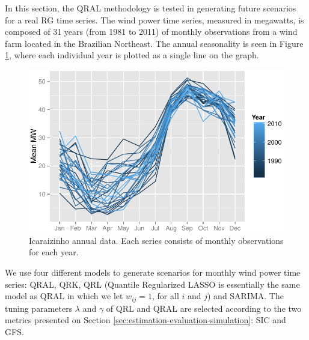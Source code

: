 In this section, the QRAL methodology is tested in generating future scenarios for a real RG time series. The wind power time series, measured in megawatts, is composed of 31 years (from 1981 to 2011) of monthly observations from a wind farm located in the Brazilian Northeast. %
The annual seasonality is seen in Figure \ref{fig:icaraizinho-mensal}, where each individual year is plotted as a single line on the graph. 
\begin{figure}[ht]
\centering
\includegraphics[width=0.8\linewidth]{Images/icaraizinho-mensal2.pdf}
\caption{Icaraizinho annual data. Each series consists of monthly observations for each year.}
\label{fig:icaraizinho-mensal}
\end{figure}

We use four different models to generate scenarios for monthly wind power time series:  QRAL, QRK, QRL (Quantile Regularized LASSO is essentially the same model as QRAL in which we let $w_{ij} = 1$, for all $i$ and $j$) and SARIMA. 
The tuning parameters $\lambda$ and $\gamma$ of QRL and QRAL are selected according to the two metrics presented on Section \ref{sec:estimation-evaluation-simulation}: SIC and GFS.

